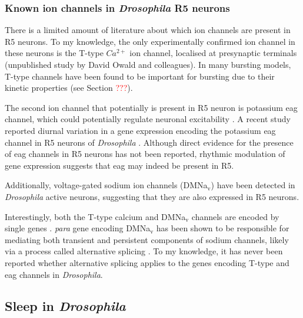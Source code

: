 \documentclass[../main.tex]{subfiles}
\begin{document}
\subsubsection{Known ion channels in \textit{Drosophila} R5 neurons}
There is a limited amount of literature about which ion channels are present in R5 neurons. To my knowledge, the only experimentally confirmed ion channel in these neurons is the T-type $Ca^{2+}$ ion channel, localised at presynaptic terminals (unpublished study by David Owald and colleagues). In many bursting models, T-type channels have been found to be important for bursting due to their kinetic properties (see Section \textcolor{red}{???}).

The second ion channel that potentially is present in R5 neuron is potassium \gls{eag} channel, which could potentially regulate neuronal excitability \cite{bruggemannEtheragogoEncodesVoltagegated1993}. A recent study reported diurnal variation in a gene expression encoding the potassium \gls{eag} channel in R5 neurons of \textit{Drosophila} \cite{doppSinglecellTranscriptomicsReveals2024}. Although direct evidence for the presence of \gls{eag} channels in R5 neurons has not been reported, rhythmic modulation of gene expression suggests that \gls{eag} may indeed be present in R5.

Additionally, voltage-gated sodium ion channels (DMNa$_{\text{v}}$) have been detected in \textit{Drosophila} active neurons, suggesting that they are also expressed in R5 neurons.

Interestingly, both the T-type calcium and DMNa$_{\text{v}}$ channels are encoded by single genes \cite{jeongCaa1TFlyTtype2015,ravenscroftDrosophilaVoltageGatedSodium2020}. \textit{para} gene encoding DMNa$_{\text{v}}$ has been shown to be responsible for mediating both transient and persistent components of sodium channels, likely via a process called alternative splicing \cite{linAlternativeSplicingVoltageGated2009}. To my knowledge, it has never been reported whether alternative splicing applies to the genes encoding T-type and \gls{eag} channels in \textit{Drosophila}.



\subsection{Sleep in \textit{Drosophila}}
\end{document}
